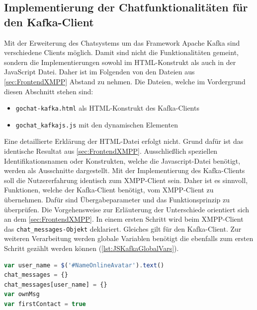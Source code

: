 \documentclass[a4paper,titlepage,halfparskip,12pt]{scrreprt}
\begin{document}
\begin{onehalfspacing}
\section{Implementierung der Chatfunktionalitäten für den Kafka-Client}
\label{HTML_JS_KafkaClient}
Mit der Erweiterung des Chatsystems um das Framework Apache Kafka sind verschiedene Clients möglich. Damit sind nicht die Funktionalitäten gemeint, sondern die Implementierungen sowohl im HTML-Konstrukt als auch in der JavaScript Datei. Daher ist im Folgenden von den Dateien aus \autoref{sec:FrontendXMPP} Abstand zu nehmen. Die Dateien, welche im Vordergrund diesen Abschnitt stehen sind:
\begin{itemize}
	\item \texttt{gochat-kafka.html} als HTML-Konstrukt des Kafka-Clients
	\item \texttt{gochat\_kafkajs.js} mit den dynamischen Elementen
\end{itemize}
Eine detaillierte Erklärung der HTML-Datei erfolgt nicht. Grund dafür ist das identische Resultat aus \autoref{sec:FrontendXMPP}. Ausschließlich speziellen Identifikationsnamen oder Konstrukten, welche die Javascript-Datei benötigt, werden als Ausschnitte dargestellt. Mit der Implementierung des Kafka-Clients soll die Nutzererfahrung identisch zum XMPP-Client sein. Daher ist es sinnvoll, Funktionen, welche der Kafka-Client benötigt, vom XMPP-Client zu übernehmen. Dafür sind Übergabeparameter und das Funktionsprinzip zu überprüfen. Die Vorgehensweise zur Erläuterung der Unterschiede orientiert sich an dem \autoref{sec:FrontendXMPP}. In einem ersten Schritt wird beim XMPP-Client das \texttt{chat\_messages-Objekt} deklariert. Gleiches gilt für den Kafka-Client. Zur weiteren Verarbeitung werden globale Variablen benötigt die ebenfalls zum ersten Schritt gezählt werden können (\autoref{lst:JSKafkaGlobalVars}).
\begin{lstlisting}[language=Javascript,caption=Globale Variablendekleration ,label={lst:JSKafkaGlobalVars}]
var user_name = $('#NameOnlineAvatar').text()
chat_messages = {}
chat_messages[user_name] = {}
var ownMsg
var firstContact = true
\end{lstlisting}

\end{onehalfspacing}
\end{document}
